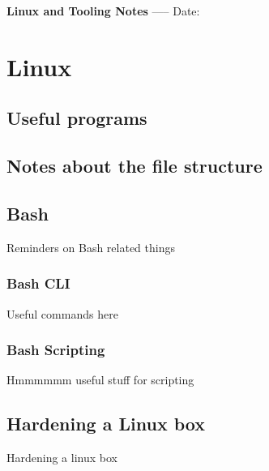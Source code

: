 \documentclass[a4paper, 11pt]{book}
\begin{document}
    \begin{titlepage}
        \centering
        \vspace*{2in}
        \Huge \textbf{Linux and Tooling Notes}
        \vfill
        \Large -----
        \vfill
        \Large Date:%
    \end{titlepage}

    \newpage

    \tableofcontents
    \newpage



    \chapter{Linux}

    \section{Useful programs}

    \section{Notes about the file structure}

    \section{Bash}
    Reminders on Bash related things

    \subsection{Bash CLI}
    Useful commands here

    \subsection{Bash Scripting}
    Hmmmmmm useful stuff for scripting

    \section{Hardening a Linux box}
    Hardening a linux box

\end{document}
